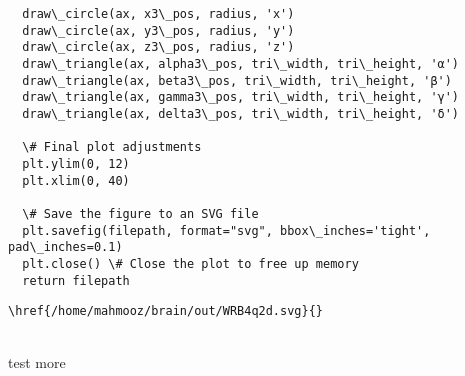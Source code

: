 \documentclass[11pt]{article}
\begin{document}
\begin{lstlisting}
  draw\_circle(ax, x3\_pos, radius, 'x')
  draw\_circle(ax, y3\_pos, radius, 'y')
  draw\_circle(ax, z3\_pos, radius, 'z')
  draw\_triangle(ax, alpha3\_pos, tri\_width, tri\_height, 'α')
  draw\_triangle(ax, beta3\_pos, tri\_width, tri\_height, 'β')
  draw\_triangle(ax, gamma3\_pos, tri\_width, tri\_height, 'γ')
  draw\_triangle(ax, delta3\_pos, tri\_width, tri\_height, 'δ')

  \# Final plot adjustments
  plt.ylim(0, 12)
  plt.xlim(0, 40)

  \# Save the figure to an SVG file
  plt.savefig(filepath, format="svg", bbox\_inches='tight', pad\_inches=0.1)
  plt.close() \# Close the plot to free up memory
  return filepath
\end{lstlisting}

\begin{lstlisting}\href{/home/mahmooz/brain/out/WRB4q2d.svg}{}\end{lstlisting}\\test more
\end{document}
